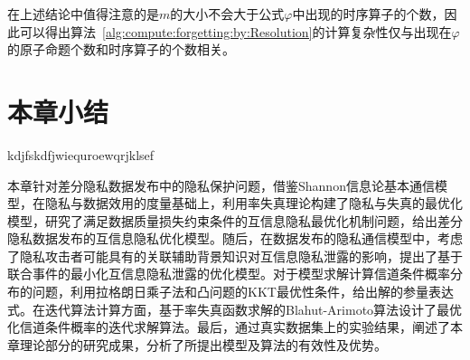 在上述结论中值得注意的是$m$的大小不会大于公式$\varphi$中出现的时序算子的个数，因此可以得出算法~\ref{alg:compute:forgetting:by:Resolution}的计算复杂性仅与出现在$\varphi$的原子命题个数和时序算子的个数相关。


\section{本章小结}\label{chapter04-conclusion}
kdjfskdfjwiequroewqrjklsef

本章针对差分隐私数据发布中的隐私保护问题，借鉴Shannon信息论基本通信模型，在隐私与数据效用的度量基础上，利用率失真理论构建了隐私与失真的最优化模型，研究了满足数据质量损失约束条件的互信息隐私最优化机制问题，给出差分隐私数据发布的互信息隐私优化模型。随后，在数据发布的隐私通信模型中，考虑了隐私攻击者可能具有的关联辅助背景知识对互信息隐私泄露的影响，提出了基于联合事件的最小化互信息隐私泄露的优化模型。对于模型求解计算信道条件概率分布的问题，利用拉格朗日乘子法和凸问题的KKT最优性条件，给出解的参量表达式。在迭代算法计算方面，基于率失真函数求解的Blahut-Arimoto算法设计了最优化信道条件概率的迭代求解算法。最后，通过真实数据集上的实验结果，阐述了本章理论部分的研究成果，分析了所提出模型及算法的有效性及优势。

